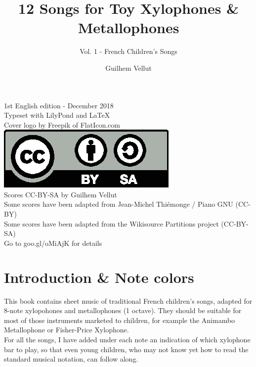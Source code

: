 \documentclass[17pt,letterpaper]{extarticle}
\title{12 Songs for Toy Xylophones \& Metallophones}
\date{Guilhem Vellut}
\author{Vol. 1 - French Children's Songs}
\makeatletter
\def\clearleftpage{\clearpage\ifodd\c@page\else
\hbox{}\newpage\if@twocolumn\hbox{}\newpage\fi\fi}
\makeatother
\begin{document}
\setcounter{secnumdepth}{-1}
\setcounter{page}{1}

\maketitle

\clearpage
\vspace*{\fill}

{\tiny 1st English edition - December 2018 \\ Typeset with LilyPond and \LaTeX \\
Cover logo by Freepik of FlatIcon.com\\
\newline
\includegraphics{by-sa} \\
\newline
Scores CC-BY-SA by Guilhem Vellut\\
Some scores have been adapted from Jean-Michel Thiémonge / Piano GNU (CC-BY)\\
Some scores have been adapted from the Wikisource Partitions project (CC-BY-SA)\\
Go to goo.gl/oMiAjK for details \par}

\clearpage

\tableofcontents

\clearleftpage

\section{Introduction \& Note colors}

This book contains sheet music of traditional French children's songs, adapted for 8-note xylopohones and metallophones (1 octave). They should be suitable for most of those instruments marketed to children, for example the Animambo Metallophone or Fisher-Price Xylophone. \\

For all the songs, I have added under each note an indication of which xylophone bar to play, so that even young children, who may not know yet how to read the standard musical notation, can follow along.\\
\end{document}
